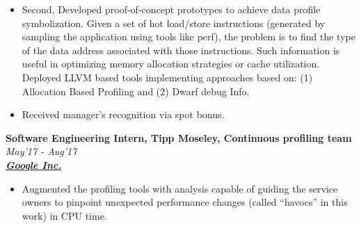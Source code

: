 \documentclass[9pt]{article}
\newenvironment{changemargin}[2]{%
  \begin{list}{}{%
    \setlength{\topsep}{0pt}%
    \setlength{\leftmargin}{#1}%
    \setlength{\rightmargin}{#2}%
    \setlength{\listparindent}{\parindent}%
    \setlength{\itemindent}{\parindent}%
    \setlength{\parsep}{\parskip}%
  }%
  \item[]}{\end{list}
}
\newcommand{\cmnt}[1]{}
\newenvironment{body} {
	\vspace*{-16pt}
	\begin{changemargin}{-0.25in}{-0.5in}
  }	
	{\end{changemargin}
}
\begin{document}
\begin{body}
\begin{itemize}
{\begin{itemize}
			\end{itemize}
                        }

\item Second, Developed proof-of-concept prototypes to achieve data profile symbolization.
                Given a set of hot load/store instructions (generated by
                    sampling the application using tools like perf), the
                problem is to find the type of the data address associated with
                those instructions. Such information is useful in optimizing memory
                allocation strategies or cache utilization.  Deployed
                LLVM based tools implementing approaches based on: (1)
                Allocation Based Profiling and (2) Dwarf debug Info.
                \item Received manager's recognition via spot bonus.

                \cmnt{
			\begin{itemize}

                          \item Based on Allocation Based Profiling: We
                          generate samples of allocation information (like
                              allocation base address, size, etc) and use that
                          to find which allocation is feeding a particular
                          load/store data address.

                          \item Based on Dwarf debug Info: Dwarf debug
                          information stores, as a best effort, the variables
                          in a given scope along with its associated type. The
                          idea is to find which variable, in load/store
                          instruction's scope, is getting consumed by a given
                          load/store data address. For that we needed to parse
                          the location list information of dwarf.

			\end{itemize}
                }

	\end{itemize}

        \textbf{Software Engineering Intern, Tipp Moseley, Continuous profiling team} \hfill \emph{May'17 - Aug'17}\\
	\textbf{\emph{\href{https://www.google.com/intl/en/about/}{Google Inc.}}}
	\begin{itemize} \itemsep -0pt
                \item  Augmented the profiling tools with analysis capable of
                guiding the service owners to pinpoint unexpected performance
                changes (called ``havocs'' in this work) in CPU time.


\end{itemize}
\end{body}
\end{document}
